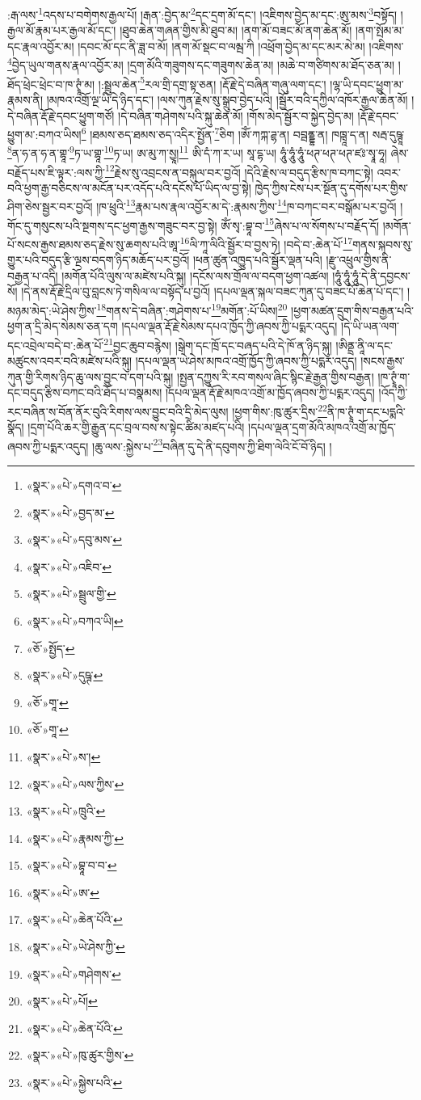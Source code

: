 :རྒ་ལས་\footnote{«སྣར་»«པེ་»དགའ་བ་}འདས་པ་བགེགས་རྒྱལ་པོ། །རྒན་:བྱེད་མ་\footnote{«སྣར་»«པེ་»བྱད་མ་}དང་དྲག་མོ་དང་། །འཇིགས་བྱེད་མ་དང་:ཨུ་མས་\footnote{«སྣར་»«པེ་»དབུ་མས་}བསྟོད། །རྒྱལ་མོ་རྣམ་པར་རྒྱལ་མོ་དང་། །ཐུབ་ཆེན་གཞན་གྱིས་མི་ཐུབ་མ། །ནག་མོ་བཟང་མོ་ནག་ཆེན་མོ། །ནག་སྤོམ་མ་དང་རྣལ་འབྱོར་མ། །དབང་མོ་དང་ནི་ཟླ་བ་མོ། །ནག་མོ་སྡང་བ་ལམྦ་ཀི །འཕྲོག་བྱེད་མ་དང་མར་མེ་མ། །འཇིགས་\footnote{«སྣར་»«པེ་»འཇིབ་}བྱེད་ཡུལ་གནས་རྣལ་འབྱོར་མ། །དྲག་མོའི་གཟུགས་དང་གཟུགས་ཆེན་མ། །མཆེ་བ་གཙིགས་མ་ཐོད་ཅན་མ། །ཐོད་ཕྲེང་ཕྲེང་བ་ཁ་ཊྭཱཾ་མ། །:སྦྲུལ་ཆེན་\footnote{«སྣར་»«པེ་»སྦྲུལ་གྱི་}རལ་གྲི་དགྲ་སྟ་ཅན། །རྡོ་རྗེ་དེ་བཞིན་གཞུ་ལག་དང་། །ལྷ་ཡི་དབང་ཕྱུག་མ་རྣམས་ནི། །མཁའ་འགྲོ་ལྔ་ཡི་དེ་ཉིད་དང་། །ལས་ཀུན་རྗེས་སུ་སྒྲུབ་བྱེད་པའི། །སྦྱོར་བའི་དཀྱིལ་འཁོར་རྒྱལ་ཆེན་མོ། །དེ་བཞིན་རྡོ་རྗེ་དབང་ཕྱུག་གཙོ། །དེ་བཞིན་གཤེགས་པའི་སྐུ་ཆེན་མོ། །གོས་མེད་སྦྱོར་བ་སྐྱེད་བྱེད་མ། །རྡོ་རྗེ་དབང་ཕྱུག་མ་:བཀའ་ཡིས།\footnote{«སྣར་»«པེ་»བཀའ་ཡི།} །ཐམས་ཅད་ཐམས་ཅད་འདིར་སྤྱོན་\footnote{«ཅོ་»སྤྱོད་}ཅིག །ཨོཾ་ཀཀྐ་ཌྷ་ན། བབྦནྡྷ་ན། ཁཁྑཱ་ད་ན། སརྦ་དུཥྚཱ་\footnote{«སྣར་»«པེ་»དུཥྚ་}ན་ཧ་ན་ཧ་ན་གྷཱ་\footnote{«ཅོ་»གཱ་}ཏ་ཡ་གྷཱ་\footnote{«ཅོ་»གཱ་}ཏ་ཡ། ཨ་མུ་ཀ་སྱཱ།\footnote{«སྣར་»«པེ་»ས་།} ཨི་དཾ་ཀ་ར་ཡ། སཱ་དྷ་ཡ། ཧཱུཾ་ཧཱུཾ་ཧཱུཾ་ཕཊ་ཕཊ་ཕཊ་ཛཿ་སྭཱ་ཧཱ། ཞེས་བརྗོད་པས་ཇི་ལྟར་:ལས་ཀྱི་\footnote{«སྣར་»«པེ་»ལས་ཀྱིས་}རྗེས་སུ་འབྲངས་ན་བསྐུལ་བར་བྱའོ། །དེའི་རྗེས་ལ་བདུད་རྩིས་ཁ་བཀང་སྟེ། འབར་བའི་ཕྱག་རྒྱ་བཅིངས་ལ་མངོན་པར་འདོད་པའི་དངོས་པོ་ཡིད་ལ་བྱ་སྟེ། ཁྱེད་ཀྱིས་ངེས་པར་སྔོན་དུ་དགོས་པར་གྱིས་ཤིག་ཅེས་སྦྱར་བར་བྱའོ། །ཁ་ཕྲུའི་\footnote{«སྣར་»«པེ་»ཁྲུའི་}རྣམ་པས་རྣལ་འབྱོར་མ་དེ་:རྣམས་ཀྱིས་\footnote{«སྣར་»«པེ་»རྣམས་ཀྱི་}ཁ་བཀང་བར་བསྒོམ་པར་བྱའོ། །གོང་དུ་གསུངས་པའི་སྔགས་དང་ཕྱག་རྒྱས་གཟུང་བར་བྱ་སྟེ། ཨོཾ་སྭ་:བྷཱ་བ་\footnote{«སྣར་»«པེ་»བྷཱ་བ་བ་}ཞེས་པ་ལ་སོགས་པ་བརྗོད་དོ། །མགོན་པོ་སངས་རྒྱས་ཐམས་ཅད་རྗེས་སུ་ཆགས་པའི་ཨཱ་\footnote{«སྣར་»«པེ་»ཨ་}ལི་ཀཱ་ལིའི་སྦྱོར་བ་བྱས་ཏེ། །བདེ་བ་:ཆེན་པོ་\footnote{«སྣར་»«པེ་»ཆེན་པོའི་}གནས་སྐབས་སུ་གྱུར་པའི་བདུད་རྩི་ལྔས་བདག་ཉིད་མཆོད་པར་བྱའོ། །ཕན་ཚུན་འཁྱུད་པའི་སྦྱོར་ལྡན་པའི། །རྫུ་འཕྲུལ་གྱིས་ནི་བརྒྱན་པ་འདི། །མགོན་པོའི་ལུས་ལ་མཛེས་པའི་སྐུ། །དངོས་ལས་གྲོལ་ལ་བདག་ཕྱག་འཚལ། །ཧཱུཾ་ཧཱུཾ་ཧཱུཾ་དེ་ནི་དབྱངས་སོ། །དེ་ནས་རྡོ་རྗེ་དྲིལ་བུ་བླངས་ཏེ་གསིལ་ལ་བསྟོད་པ་བྱའོ། །དཔལ་ལྡན་སྐལ་བཟང་ཀུན་དུ་བཟང་པོ་ཆེན་པོ་དང་། །མཉམ་མེད་:ཡེ་ཤེས་ཀྱིས་\footnote{«སྣར་»«པེ་»ཡེ་ཤེས་ཀྱི་}གནས་དེ་བཞིན་:གཤེགས་པ་\footnote{«སྣར་»«པེ་»གཤེགས་}མགོན་:པོ་ཡིས།\footnote{«སྣར་»«པེ་»པོ།} །ཕྱག་མཚན་དྲུག་གིས་བརྒྱན་པའི་ཕྱག་ན་དྲི་མེད་སེམས་ཅན་དག །དཔལ་ལྡན་རྡོ་རྗེ་སེམས་དཔའ་ཁྱོད་ཀྱི་ཞབས་ཀྱི་པདྨར་འདུད། །དེ་ཡི་ཡན་ལག་དང་འབྲེལ་བདེ་བ་:ཆེན་པོ་\footnote{«སྣར་»«པེ་»ཆེན་པོའི་}བྱང་ཆུབ་བརྙེས། །སྒེག་དང་ཁྲོ་དང་བཞད་པའི་དེ་ཁོ་ན་ཉིད་སྐུ། །ཨིནྡྲ་ནཱི་ལ་དང་མཚུངས་འབར་བའི་མཛེས་པའི་སྐུ། །དཔལ་ལྡན་ཡེ་ཤེས་མཁའ་འགྲོ་ཁྱོད་ཀྱི་ཞབས་ཀྱི་པདྨར་འདུད། །སངས་རྒྱས་ཀུན་གྱི་རིགས་ཉིད་ཆུ་ལས་བྱུང་བ་དག་པའི་སྐུ། །སྤྱན་དཀྱུས་རི་རབ་གསལ་ཞིང་སྙིང་རྗེ་རྒྱན་གྱིས་བརྒྱན། །ཁ་ཊྭཱཾ་ག་དང་བདུད་རྩིས་བཀང་བའི་ཐོད་པ་བསྣམས། །དཔལ་ལྡན་རྡོ་རྗེ་མཁའ་འགྲོ་མ་ཁྱོད་ཞབས་ཀྱི་པདྨར་འདུད། །འོད་ཀྱི་རང་བཞིན་ས་བོན་ནོར་བུའི་རིགས་ལས་བྱུང་བའི་དྲི་མེད་ལུས། །ཕྱག་གིས་:ཁུ་ཚུར་དྲིས་\footnote{«སྣར་»«པེ་»ཁུ་ཚུར་གྱིས་}ནི་ཁ་ཊྭཱཾ་ག་དང་པདྨའི་སྣོད། །དྲག་པོའི་ཆར་གྱི་རྒྱུན་དང་བྲལ་བས་ས་སྟེང་ཚིམ་མཛད་པའི། །དཔལ་ལྡན་དྲག་མོའི་མཁའ་འགྲོ་མ་ཁྱོད་ཞབས་ཀྱི་པདྨར་འདུད། །ཆུ་ལས་:སྐྱེས་པ་\footnote{«སྣར་»«པེ་»སྐྱེས་པའི་}བཞིན་དུ་དེ་ནི་དབུགས་ཀྱི་ཐིག་ལེའི་ངོ་བོ་ཉིད། །
